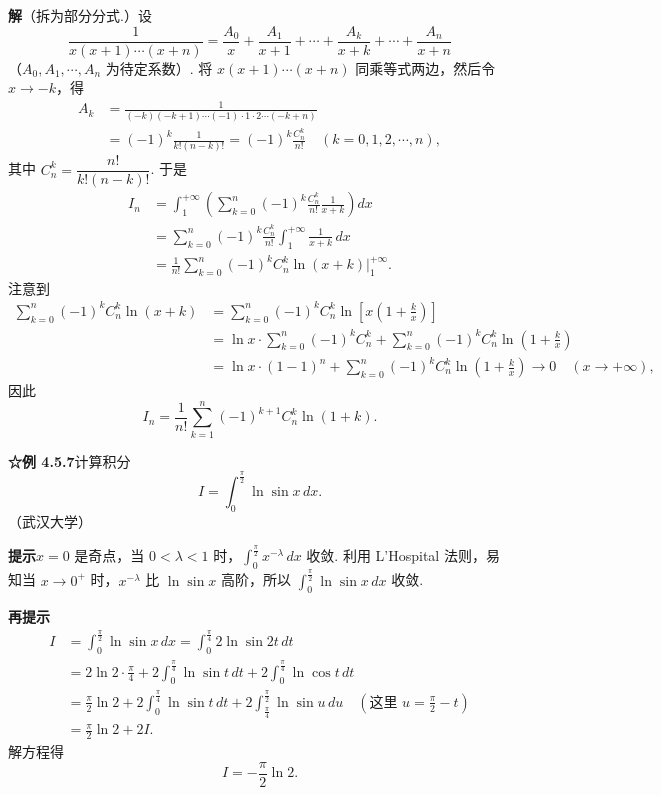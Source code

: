 \documentclass[UTF8,12pt,a4paper,fontset=fandol]{ctexart}
\begin{document}
\noindent\textbf{解}\quad （拆为部分分式.）设
\[
\frac1{x(x+1)\cdots(x+n)}
=\frac{A_0}{x}+\frac{A_1}{x+1}+\cdots+\frac{A_k}{x+k}
+\cdots+\frac{A_n}{x+n}
\]
（$A_0,A_1,\cdots,A_n$ 为待定系数）. 将 $x(x+1)\cdots(x+n)$ 同乘等式两边，然后令 $x\to-k$，得
\[
\begin{aligned}
A_k&=\frac1{(-k)(-k+1)\cdots(-1)\cdot1\cdot2\cdots(-k+n)}\\
&=(-1)^k\frac1{k!(n-k)!}=(-1)^k\frac{C_n^k}{n!}\quad(k=0,1,2,\cdots,n),
\end{aligned}
\]
其中 $C_n^k=\dfrac{n!}{k!(n-k)!}$. 于是
\[
\begin{aligned}
I_n&=\int_1^{+\infty}\left(\sum_{k=0}^n(-1)^k\frac{C_n^k}{n!}\frac1{x+k}\right)dx\\
&=\sum_{k=0}^n(-1)^k\frac{C_n^k}{n!}\int_1^{+\infty}\frac1{x+k}\,dx\\
&=\frac1{n!}\sum_{k=0}^n(-1)^k C_n^k\ln(x+k)\Big|_1^{+\infty}.
\end{aligned}
\]
注意到
\[
\begin{aligned}
\sum_{k=0}^n(-1)^k C_n^k\ln(x+k)
&=\sum_{k=0}^n(-1)^k C_n^k\ln\left[x\left(1+\frac{k}{x}\right)\right]\\
&=\ln x\cdot\sum_{k=0}^n(-1)^k C_n^k
+\sum_{k=0}^n(-1)^k C_n^k\ln\left(1+\frac{k}{x}\right)\\
&=\ln x\cdot(1-1)^n+\sum_{k=0}^n(-1)^k C_n^k\ln\left(1+\frac{k}{x}\right)
\longrightarrow0\quad(x\to+\infty),
\end{aligned}
\]
因此
\[
I_n=\frac1{n!}\sum_{k=1}^n(-1)^{k+1}C_n^k\ln(1+k).
\]

\noindent\textbf{☆例 4.5.7}\quad 计算积分
\[
I=\int_0^{\frac\pi2}\ln\sin x\,dx.
\]
（武汉大学）

\noindent\textbf{提示}\quad $x=0$ 是奇点，当 $0<\lambda<1$ 时，$\int_0^{\frac\pi2}x^{-\lambda}\,dx$ 收敛. 利用 L'Hospital 法则，易知当 $x\to0^+$ 时，$x^{-\lambda}$ 比 $\ln\sin x$ 高阶，所以 $\int_0^{\frac\pi2}\ln\sin x\,dx$ 收敛.

\noindent\textbf{再提示}\quad
\[
\begin{aligned}
I&=\int_0^{\frac\pi2}\ln\sin x\,dx
=\int_0^{\frac\pi4}2\ln\sin2t\,dt\\
&=2\ln2\cdot\frac\pi4
+2\int_0^{\frac\pi4}\ln\sin t\,dt
+2\int_0^{\frac\pi4}\ln\cos t\,dt\\
&=\frac\pi2\ln2+2\int_0^{\frac\pi4}\ln\sin t\,dt
+2\int_{\frac\pi4}^{\frac\pi2}\ln\sin u\,du
\quad\left(\text{这里 }u=\frac\pi2-t\right)\\
&=\frac\pi2\ln2+2I.
\end{aligned}
\]
解方程得
\[
I=-\frac\pi2\ln2.
\]
\end{document}

